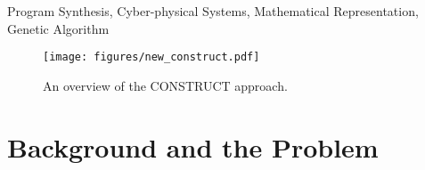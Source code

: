 \documentclass[10pt,conference]{IEEEtran}
\begin{document}
\begin{IEEEkeywords}
Program Synthesis, Cyber-physical Systems, Mathematical Representation, Genetic Algorithm
\end{IEEEkeywords}


\begin{figure*}[h]
  \centering
  \texttt{[image: figures/new\_construct.pdf]}
    \vspace{-6pt}

  \caption{An overview of the \textsc{CONSTRUCT} approach.}
  \label{fig:CONSTRUCT}
          \vspace{-6pt}
\end{figure*}

\section{Background and the Problem}
\label{sec:Introduction}
\end{document}
